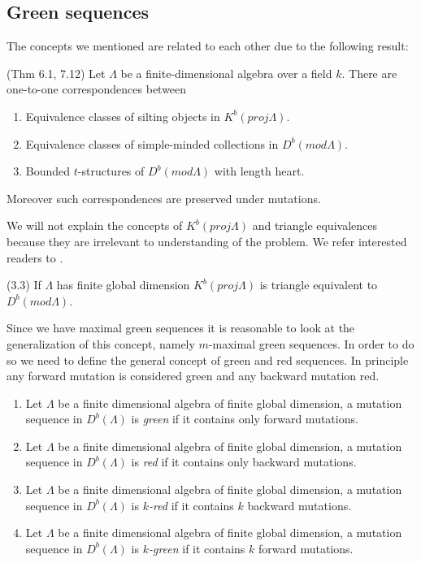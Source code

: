 \subsection{Green sequences}
\indent The concepts we mentioned are related to each other due to the following result:
\begin{theorem}
\cite{KY12}(Thm 6.1, 7.12) Let $\Lambda$ be a finite-dimensional algebra over a field $k$. There are one-to-one
correspondences between
\begin{enumerate}
\item Equivalence classes of silting objects in $K^b(proj \Lambda)$.
\item Equivalence classes of simple-minded collections in $D^b(mod \Lambda)$.
\item Bounded $t$-structures of $D^b(mod \Lambda)$ with length heart.
\end{enumerate}
Moreover such correspondences are preserved under mutations.
\end{theorem}
\indent We will not explain the concepts of $K^b(proj \Lambda)$ and triangle equivalences because they are irrelevant to understanding of the problem. We refer interested readers to \cite{H88}. 
\begin{theorem}
\cite{H88}(3.3) If $\Lambda$ has finite global dimension $K^b(proj \Lambda)$ is triangle equivalent to $D^b(mod \Lambda)$.
\end{theorem}
\indent Since we have maximal green sequences it is reasonable to look at the generalization of this concept, namely $m$-maximal green sequences. In order to do so we need to define the general concept of green and red sequences. In principle any forward mutation is considered green and any backward mutation red.\\
\begin{definition}
\begin{enumerate}
\item Let $\Lambda$ be a finite dimensional algebra of finite global dimension, a mutation sequence in $D^b(\Lambda)$ is \textit{green} if it contains only forward mutations. 
\item Let $\Lambda$ be a finite dimensional algebra of finite global dimension, a mutation sequence in $D^b(\Lambda)$ is \textit{red} if it contains only backward mutations. 
\item Let $\Lambda$ be a finite dimensional algebra of finite global dimension, a mutation sequence in $D^b(\Lambda)$ is \textit{$k$-red} if it contains $k$ backward mutations. 
\item Let $\Lambda$ be a finite dimensional algebra of finite global dimension, a mutation sequence in $D^b(\Lambda)$ is \textit{$k$-green} if it contains $k$ forward mutations.
\end{enumerate}
\end{definition}
